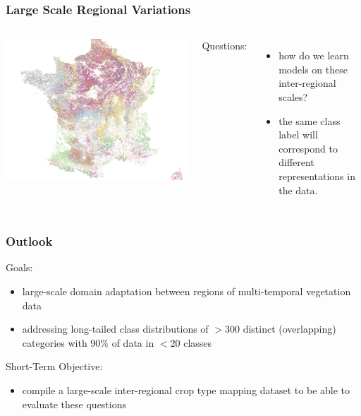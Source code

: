 \begin{frame}
	\frametitle{Large Scale Regional Variations}
	
	\begin{columns}
			\includegraphics[width=\textwidth]{images/France}
		\Large
		
		Questions:
			\begin{itemize}
				\item how do we learn models on these inter-regional scales?
				\item the same class label will correspond to different representations in the data.
			\end{itemize}
	\end{columns}
	
\end{frame}

\begin{frame}
	\frametitle{Outlook}
	
	\Large
	
	Goals:
	\begin{itemize}
		\item large-scale domain adaptation between regions of multi-temporal vegetation data
		\item addressing long-tailed class distributions of $>$300 distinct (overlapping) categories with 90\% of data in $<$20 classes
	\end{itemize}

	Short-Term Objective:
	\begin{itemize}
		\item compile a large-scale inter-regional crop type mapping dataset to be able to evaluate these questions
	\end{itemize}
\end{frame}

